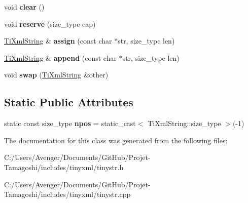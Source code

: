\begin{DoxyCompactItemize}
\item 
\hypertarget{class_ti_xml_string_ab20e06e4c666abf3bdbfb3a1191d4888}{void {\bfseries clear} ()}\label{class_ti_xml_string_ab20e06e4c666abf3bdbfb3a1191d4888}

\item 
\hypertarget{class_ti_xml_string_a88ecf9f0f00cb5c67b6b637958d7049c}{void {\bfseries reserve} (size\+\_\+type cap)}\label{class_ti_xml_string_a88ecf9f0f00cb5c67b6b637958d7049c}

\item 
\hypertarget{class_ti_xml_string_ac72f3d9149b7812c1e6c59402014d0d5}{\hyperlink{class_ti_xml_string}{Ti\+Xml\+String} \& {\bfseries assign} (const char $\ast$str, size\+\_\+type len)}\label{class_ti_xml_string_ac72f3d9149b7812c1e6c59402014d0d5}

\item 
\hypertarget{class_ti_xml_string_ad44b21700d2ec24a511367b222b643fb}{\hyperlink{class_ti_xml_string}{Ti\+Xml\+String} \& {\bfseries append} (const char $\ast$str, size\+\_\+type len)}\label{class_ti_xml_string_ad44b21700d2ec24a511367b222b643fb}

\item 
\hypertarget{class_ti_xml_string_aa392cbc180752a79f007f4f9280c7762}{void {\bfseries swap} (\hyperlink{class_ti_xml_string}{Ti\+Xml\+String} \&other)}\label{class_ti_xml_string_aa392cbc180752a79f007f4f9280c7762}

\end{DoxyCompactItemize}
\subsection*{Static Public Attributes}
\begin{DoxyCompactItemize}
\item 
\hypertarget{class_ti_xml_string_a8f4422d227088dc7bec96f479b275d0a}{static const size\+\_\+type {\bfseries npos} = static\+\_\+cast$<$ Ti\+Xml\+String\+::size\+\_\+type $>$(-\/1)}\label{class_ti_xml_string_a8f4422d227088dc7bec96f479b275d0a}

\end{DoxyCompactItemize}


The documentation for this class was generated from the following files\+:\begin{DoxyCompactItemize}
\item 
C\+:/\+Users/\+Avenger/\+Documents/\+Git\+Hub/\+Projet-\/\+Tamagoshi/includes/tinyxml/tinystr.\+h\item 
C\+:/\+Users/\+Avenger/\+Documents/\+Git\+Hub/\+Projet-\/\+Tamagoshi/includes/tinyxml/tinystr.\+cpp\end{DoxyCompactItemize}
